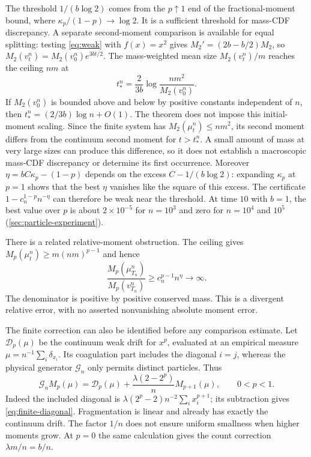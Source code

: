 \begin{remark}
\label{rem:finite-constant}
The threshold $1/(b\log2)$ comes from the $p\uparrow1$ end of the
fractional-moment bound, where $\kappa_p/(1-p)\to\log2$. It is a sufficient
threshold for mass-CDF discrepancy. A separate second-moment comparison
is available for equal splitting: testing \eqref{eq:weak} with $f(x)=x^2$
gives $M_2'=(2b-b/2)M_2$, so
$M_2(v_t^n)=M_2(v_0^n)e^{3bt/2}$. The mass-weighted mean size
$M_2(v_t^n)/m$ reaches the ceiling $nm$ at
\[
 t_*^n=\frac{2}{3b}\log\frac{nm^2}{M_2(v_0^n)}.
\]
If $M_2(v_0^n)$ is bounded above and below by positive constants
independent of $n$, then $t_*^n=(2/3b)\log n+O(1)$. The theorem does
not impose this initial-moment scaling. Since the finite system has
$M_2(\mu_t^n)\leq nm^2$, its second moment differs from the continuum
second moment for $t>t_*^n$. A small amount of mass at very large sizes
can produce this difference, so it does not establish a macroscopic
mass-CDF discrepancy or determine its first occurrence.
Moreover $\eta=bC\kappa_p-(1-p)$ depends on
the excess $C-1/(b\log2)$: expanding $\kappa_p$ at $p=1$ shows that the best
$\eta$ vanishes like the square of this excess. The certificate
$1-c_n^{1-p}n^{-\eta}$ can therefore be weak near the threshold. At time $10$
with $b=1$, the best value over $p$ is about $2\times10^{-5}$ for $n=10^3$
and zero for $n=10^4$ and $10^5$ (\cref{sec:particle-experiment}).
\end{remark}

There is a related relative-moment obstruction. The ceiling gives
$M_p(\mu_t^n)\geq m(nm)^{p-1}$ and hence
\begin{equation}
 \frac{M_p(\mu_{T_n}^n)}{M_p(v_{T_n}^n)}
 \geq c_n^{p-1}n^\eta\longrightarrow\infty.
 \label{eq:finite-moment-ratio}
\end{equation}
The denominator is positive by positive conserved mass. This is a divergent
relative error, with no asserted nonvanishing absolute moment error.

The finite correction can also be identified before any comparison estimate.
Let $\mathcal D_p(\mu)$ be the continuum weak drift for $x^p$, evaluated at
an empirical measure $\mu=n^{-1}\sum_i\delta_{x_i}$. Its coagulation part
includes the diagonal $i=j$, whereas the physical generator $\mathcal G_n$
only permits distinct particles. Thus
\begin{equation}
 \mathcal G_n M_p(\mu)
 =\mathcal D_p(\mu)+\frac{\lambda(2-2^p)}n M_{p+1}(\mu),
 \qquad 0<p<1.
 \label{eq:finite-diagonal}
\end{equation}
Indeed the included diagonal is
$\lambda(2^p-2)n^{-2}\sum_i x_i^{p+1}$; its subtraction gives
\eqref{eq:finite-diagonal}. Fragmentation is linear and already has exactly
the continuum drift. The factor $1/n$ does not ensure uniform smallness
when higher moments grow. At $p=0$ the same calculation gives the count
correction $\lambda m/n=b/n$.

